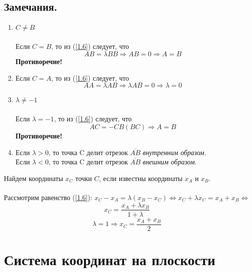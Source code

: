\documentclass[a4paper, 12pt]{report}
\begin{document}
	\subsection*{Замечания.}
	\begin{enumerate}
		\item $C \ne B$\\\\
		Если $C = B$, то из (\ref{1.6}) следует, что $$AB = \lambda BB \Rightarrow AB = 0 \Rightarrow A = B$$ \textbf{Противоречие!}
			
		\item 
		Если $C = A$, то из (\ref{1.6}) следует, что $$AA = \lambda AB \Rightarrow \lambda AB = 0 \Rightarrow \lambda = 0$$
			
		\item $\lambda \ne -1$\\\\
		Если $\lambda = -1$, то из (\ref{1.6}) следует, что $$AC = -CB (BC) \Rightarrow A = B$$ \textbf{Противоречие!}
		
		\item Если $\lambda > 0$, то точка C делит отрезок $\overline{AB}$ \textit{внутренним образом}.\\
		Если $\lambda < 0$, то точка C делит отрезок $\overline{AB}$ \textit{внешним образом}.\\
	\end{enumerate}
	\quad{} Найдем координаты $x_C$ точки $C$, если известны координаты $x_A$ и $x_B$.\\\\
	Рассмотрим равенство (\ref{1.6}): $x_C - x_A = \lambda (x_B - x_C) \Leftrightarrow x_C + \lambda x_C = x_A + x_B \Leftrightarrow$ 
	\begin{equation}\label{1.7}
		\boxed{x_C = \frac{x_A + \lambda  x_B}{1 + \lambda}} \tag{7}
	\end{equation}
	\begin{equation}\label{1.8}
		\lambda = 1 \Rightarrow x_C = \frac{x_A + x_B}{2} \tag{8}
	\end{equation}
	
	\section{Система координат на плоскости}
\end{document}
